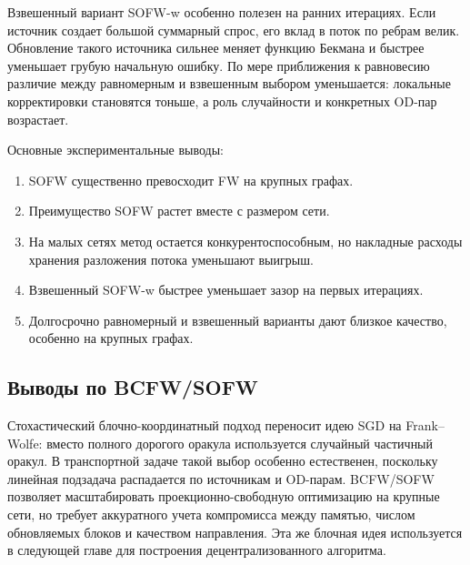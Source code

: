 Взвешенный вариант SOFW-w особенно полезен на ранних итерациях.
Если источник создает большой суммарный спрос, его вклад в поток по ребрам велик.
Обновление такого источника сильнее меняет функцию Бекмана и быстрее уменьшает грубую
начальную ошибку.
По мере приближения к равновесию различие между равномерным и взвешенным выбором уменьшается:
локальные корректировки становятся тоньше, а роль случайности и конкретных OD-пар возрастает.

Основные экспериментальные выводы:
\begin{enumerate}
    \item SOFW существенно превосходит FW на крупных графах.
    \item Преимущество SOFW растет вместе с размером сети.
    \item На малых сетях метод остается конкурентоспособным, но накладные расходы хранения разложения потока уменьшают выигрыш.
    \item Взвешенный SOFW-w быстрее уменьшает зазор на первых итерациях.
    \item Долгосрочно равномерный и взвешенный варианты дают близкое качество, особенно на крупных графах.
\end{enumerate}



\subsection{Выводы по BCFW/SOFW}

Стохастический блочно-координатный подход переносит идею SGD на Frank--Wolfe: вместо полного дорогого оракула используется случайный частичный оракул.
В транспортной задаче такой выбор особенно естественен, поскольку линейная подзадача распадается по источникам и OD-парам.
BCFW/SOFW позволяет масштабировать проекционно-свободную оптимизацию на крупные сети, но требует аккуратного учета компромисса между памятью, числом обновляемых блоков и качеством направления.
Эта же блочная идея используется в следующей главе для построения децентрализованного алгоритма.
